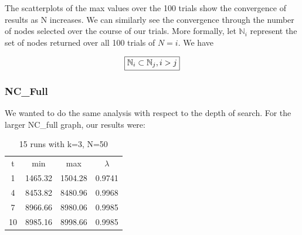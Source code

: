 \documentclass{article}
\begin{document}
		The scatterplots of the max values over the 100 trials show the convergence of results as N increases. We can similarly see the convergence through the number of nodes selected over the course of our trials. More formally, let $\mathbb{N}_i$ represent the set of nodes returned over all 100 trials of $N=i$. We have

		\begin{equation}
		\boxed{
			 \mathbb{N}_i \subset \mathbb{N}_j, i > j\\
		}
		\end{equation}

	\subsubsection{NC\_Full}

		We wanted to do the same analysis with respect to the depth of search. For the larger NC\_full graph, our results were:

		\begin{table}[h!]
		  \begin{center}
		    \caption{15 runs with k=3, N=50}
		    \label{tab:table1}
		    \begin{tabular}{|c|c|c|c|} 
		      \hline
		      t & min & max & $\lambda$\\
		      1  & 1465.32 & 1504.28 & 0.9741\\
		      4  & 8453.82 & 8480.96 & 0.9968\\
		      7  & 8966.66 & 8980.06 & 0.9985\\
		      10 & 8985.16 & 8998.66 & 0.9985\\
		      \hline
		    \end{tabular}
		  \end{center}
		\end{table}
\end{document}
